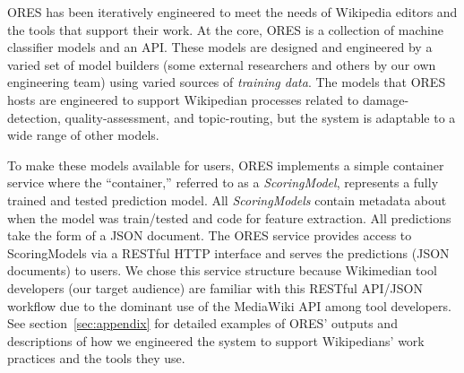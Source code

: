 
ORES has been iteratively engineered to meet the needs of Wikipedia editors and the tools that support their work.  At the core, ORES is a collection of machine classifier models and an API.  These models are designed and engineered by a varied set of model builders (some external researchers and others by our own engineering team) using varied sources of \emph{training data}.  The models that ORES hosts are engineered to support Wikipedian processes related to damage-detection, quality-assessment, and topic-routing, but the system is adaptable to a wide range of other models.

To make these models available for users, ORES implements a simple container service where the ``container,'' referred to as a \emph{ScoringModel}, represents a fully trained and tested prediction model.  All \emph{ScoringModels} contain metadata about when the model was train/tested and code for feature extraction.  All predictions take the form of a JSON document.  The ORES service provides access to ScoringModels via a RESTful HTTP interface and serves the predictions (JSON documents) to users.  We chose this service structure because Wikimedian tool developers (our target audience) are familiar with this RESTful API/JSON workflow due to the dominant use of the MediaWiki API among tool developers.  See section~\ref{sec:appendix} for detailed examples of ORES' outputs and descriptions of how we engineered the system to support Wikipedians' work practices and the tools they use. 
